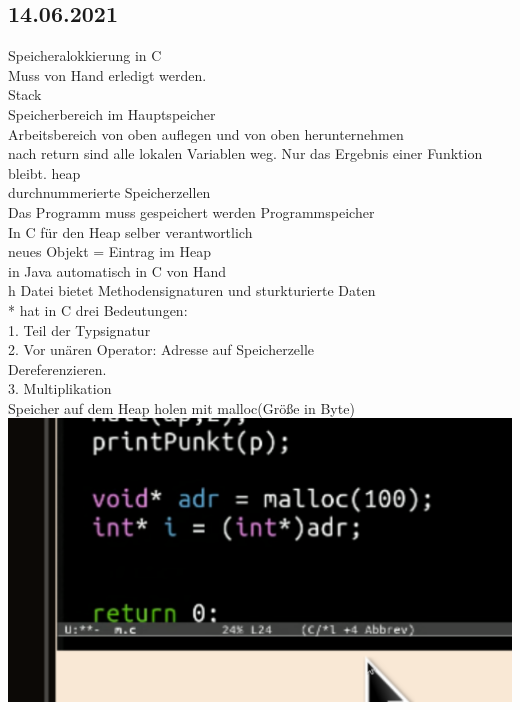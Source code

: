 \documentclass[paper=A4]{article}
\begin{document}
 	\subsection*{14.06.2021}
 	Speicheralokkierung in C \\
 	Muss von Hand erledigt werden. \\
 	Stack \\
 	Speicherbereich im Hauptspeicher \\
 	Arbeitsbereich von oben auflegen und von oben herunternehmen \\
 	nach return sind alle lokalen Variablen weg.
 	Nur das Ergebnis einer Funktion bleibt.
 	heap \\
 	durchnummerierte Speicherzellen \\
 	Das Programm muss gespeichert werden
 	Programmspeicher \\
 	In C für den Heap selber verantwortlich \\
 	neues Objekt = Eintrag im Heap \\
 	in Java automatisch in C von Hand \\
 	h Datei bietet Methodensignaturen und sturkturierte Daten \\
 	* hat in C drei Bedeutungen: \\
 	1. Teil der Typsignatur \\
 	2. Vor unären Operator: Adresse auf Speicherzelle\\
 	Dereferenzieren. \\
 	3. Multiplikation \\
 	Speicher auf dem Heap holen mit malloc(Größe in Byte) \\
 	\includegraphics[width=\linewidth]{samplec}
 	\\
\end{document}
